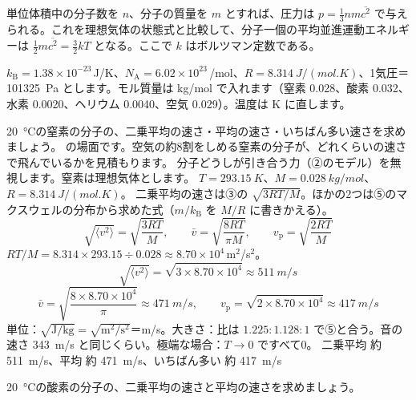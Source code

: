 \begin{senmonsho}[気体分子運動論]
\begin{bkhonbun}
単位体積中の分子数を $n$、分子の質量を $m$ とすれば、圧力は $p=\frac13nm\overline{c^2}$ で与えられる。これを理想気体の状態式と比較して、分子一個の平均並進運動エネルギーは $\frac12m\overline{c^2}=\frac32kT$ となる。ここで $k$ はボルツマン定数である。
\end{bkhonbun}
\end{senmonsho}


\noindent $k_{\mathrm B}=1.38\times10^{-23}$\,J/K、$N_{\mathrm A}=6.02\times10^{23}$\,/mol、$R=\qty{8.314}{J/(mol.K)}$、1気圧＝\qty{101325}{Pa} とします。モル質量は kg/mol で入れます（窒素 0.028、酸素 0.032、水素 0.0020、ヘリウム 0.0040、空気 0.029）。温度は K に直します。

\begin{phreidai}[20 ℃の窒素の分子の速さ]
\label{ph:熱-14:ex1}\qty{20}{\celsius}の窒素の分子の、二乗平均の速さ・平均の速さ・いちばん多い速さを求めましょう。
\phbamen
\bkhatenaref の場面です。空気の約8割をしめる窒素の分子が、どれくらいの速さで飛んでいるかを見積もります。
\phmushi
分子どうしが引き合う力（②のモデル）を無視します。窒素は理想気体とします。
\phzu
$T=\qty{293.15}{K}$、$M=\qty{0.028}{kg/mol}$、$R=\qty{8.314}{J/(mol.K)}$。
\phriyu
二乗平均の速さは③の $\sqrt{3RT/M}$。ほかの2つは⑤のマクスウェルの分布から求めた式（$m/k_{\mathrm B}$ を $M/R$ に書きかえる）。
\phtateru
\[ \sqrt{\langle v^2\rangle}=\sqrt{\frac{3RT}{M}},\qquad \bar v=\sqrt{\frac{8RT}{\pi M}},\qquad v_{\mathrm p}=\sqrt{\frac{2RT}{M}} \]
\phtoku
$RT/M=8.314\times293.15\div0.028\approx8.70\times10^4$\,m$^2$/s$^2$。
\[ \sqrt{\langle v^2\rangle}=\sqrt{3\times8.70\times10^4}\approx\qty{511}{m/s} \]
\[ \bar v=\sqrt{\frac{8\times8.70\times10^4}{\pi}}\approx\qty{471}{m/s},\qquad v_{\mathrm p}=\sqrt{2\times8.70\times10^4}\approx\qty{417}{m/s} \]
\phtashikame
単位：$\sqrt{\text{J/kg}}=\sqrt{\text{m}^2/\text{s}^2}$＝m/s。大きさ：比は $1.225:1.128:1$ で⑤と合う。音の速さ \qty{343}{m/s} と同じくらい。極端な場合：$T\to0$ ですべて0。
\kotae 二乗平均 約 \qty{511}{m/s}、平均 約 \qty{471}{m/s}、いちばん多い 約 \qty{417}{m/s}
\end{phreidai}
\begin{jibun}
\qty{20}{\celsius}の酸素の分子の、二乗平均の速さと平均の速さを求めましょう。
\end{jibun}

